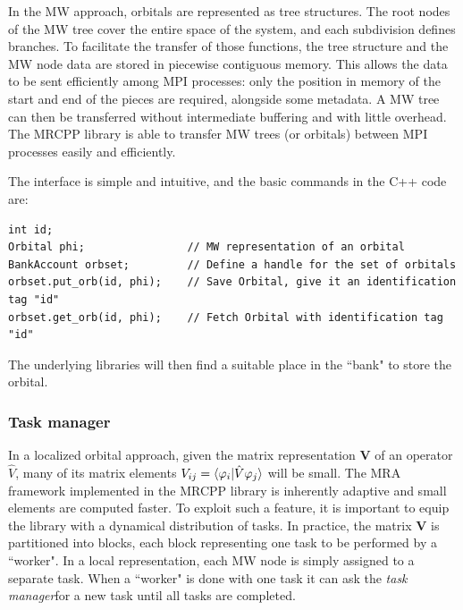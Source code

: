 \documentclass[journal=jctcce, manuscript=article]{achemso}
\begin{document}
In the \ac{MW} approach, orbitals are represented as tree structures. The root nodes of the \ac{MW} tree cover the entire space of the system, and each subdivision defines branches. To facilitate the transfer of those functions, the tree structure and the \ac{MW} node data are stored in piecewise contiguous memory. This allows the data to be sent efficiently among MPI processes: only the position in memory of the start and end of the pieces are required, alongside some metadata. A \ac{MW} tree can then be transferred without intermediate buffering and with little overhead. 
The MRCPP library is able to transfer \ac{MW} trees (or orbitals) between \ac{MPI} processes easily and efficiently. 

The interface is simple and intuitive, and the basic commands in the C++ code are:
\begin{verbatim}
int id;
Orbital phi;                // MW representation of an orbital
BankAccount orbset;         // Define a handle for the set of orbitals 
orbset.put_orb(id, phi);    // Save Orbital, give it an identification tag "id"
orbset.get_orb(id, phi);    // Fetch Orbital with identification tag "id"

\end{verbatim}
The underlying libraries will then find a suitable place in the ``bank" to store the orbital.


\subsubsection{Task manager} 
In a localized orbital approach, given the matrix representation $\mathbf{V}$ of an operator $\hat{V}$, many of its matrix elements $V_{ij} = \braket{\varphi_i|{\hat V} \varphi_j}$ will be small. The \ac{MRA} framework implemented in the MRCPP library is inherently adaptive and small elements are computed faster. To exploit such a feature, it is important to equip the library with a dynamical distribution of tasks.
In practice, the matrix $\mathbf{V}$ is partitioned into blocks, each block representing one task to be performed by a ``worker". In a local representation, each \ac{MW} node is simply assigned to a separate task. When a ``worker" is done with one task it can ask the \emph{task manager}for a new task until all tasks are completed.
\end{document}
